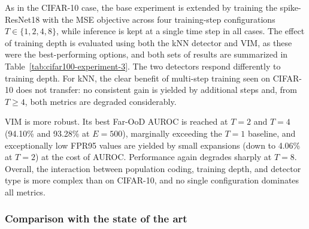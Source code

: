 \documentclass{ieeeaccess}
\begin{document}
As in the CIFAR-10 case, the base experiment is extended by training the spike-ResNet18 with the MSE objective across four training-step configurations $T \in \{1, 2, 4, 8\}$, while inference is kept at a single time step in all cases. The effect of training depth is evaluated using both the kNN detector and VIM, as these were the best-performing options, and both sets of results are summarized in Table~\ref{tab:cifar100-experiment-3}. The two detectors respond differently to training depth. For kNN, the clear benefit of multi-step training seen on CIFAR-10 does not transfer: no consistent gain is yielded by additional steps and, from $T \geq 4$, both metrics are degraded considerably.

VIM is more robust. Its best Far-OoD AUROC is reached at $T=2$ and $T=4$ (94.10\% and 93.28\% at $E=500$), marginally exceeding the $T=1$ baseline, and exceptionally low FPR95 values are yielded by small expansions (down to 4.06\% at $T=2$) at the cost of AUROC. Performance again degrades sharply at $T=8$. Overall, the interaction between population coding, training depth, and detector type is more complex than on CIFAR-10, and no single configuration dominates all metrics.

\subsubsection*{Comparison with the state of the art}
\end{document}
